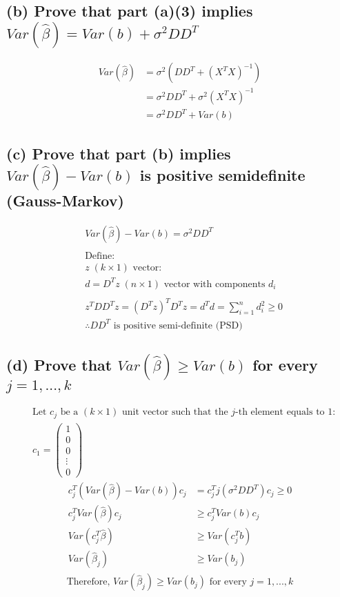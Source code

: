 \documentclass[12pt, a4paper]{article}
\begin{document}
\subsection*{(b) Prove that part (a)(3) implies $Var(\hat{\beta}) = Var(b) + \sigma^2DD^T$}
\begin{align*}
    Var(\hat{\beta})&= \sigma^2(DD^T + (X^TX)^{-1})\\
    &= \sigma^2DD^T + \sigma^2(X^TX)^{-1}\\
    & = \sigma^2DD^T + Var(b)
\end{align*}
\vspace{1em}

\subsection*{(c) Prove that part (b) implies $Var(\hat{\beta}) - Var(b)$ is positive semidefinite (Gauss-Markov)}
\begin{align*}
    &Var(\hat{\beta}) - Var(b)= \sigma^2DD^T \\\\
    &\text{Define:}\\
    &z\;(k\times1)\text{ vector:}\\
    &d = D^Tz\;(n\times1)\text{ vector with components }d_i\\\\
    &z^TDD^Tz = (D^Tz)^TD^Tz = d^Td = \sum_{i=1}^nd_i^2 \geq 0\\
    &\therefore DD^T \text{ is positive semi-definite (PSD)}
\end{align*}
\vspace{1em}

\subsection*{(d) Prove that $Var(\hat{\beta}) \geq Var(b)$ for every $j = 1, ..., k$}
\begin{align*}
    &\text{Let $c_j$ be a $(k\times1)$ unit vector such that the $j$-th element equals to 1:}\\
    &c_1=\left(\begin{array}{c}
        1\\
        0\\
        0\\
        \vdots\\
        0
    \end{array}\right)
\end{align*}
\begin{align*}
    c^T_j(Var(\hat{\beta}) - Var(b))c_j &= c^T_jj(\sigma^2DD^T)c_j \geq 0\\
    c^T_jVar(\hat{\beta})c_j&\geq c^T_jVar(b)c_j\\
    Var(c^T_j\hat{\beta})&\geq Var(c^T_jb)\\
    Var(\hat{\beta}_j)&\geq Var(b_j)
\end{align*}
\begin{align*}
    \text{Therefore, $Var(\hat{\beta}_j)\geq Var(b_j)$ for every $j=1,...,k$}
\end{align*}

\vspace{1em}
\end{document}
